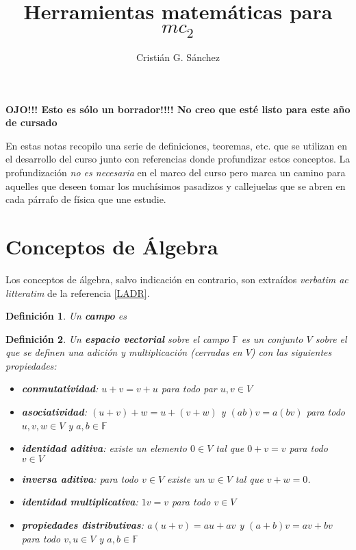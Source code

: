 \documentclass[a4paper,12pt]{article}
\newtheorem{defi}{Definición}
\begin{document}
\title{Herramientas matemáticas para $mc_2$}

\author{Cristián G. Sánchez}

\date{}

\maketitle

{\bf OJO!!! Esto es sólo un borrador!!!! No creo que esté listo para este año de cursado}

En estas notas recopilo una serie de definiciones, teoremas, etc. que se utilizan en el desarrollo del curso junto con referencias donde profundizar estos conceptos. La profundización {\em no es necesaria} en el marco del curso pero marca un camino para aquelles que deseen  tomar los muchísimos pasadizos y callejuelas que se abren en cada párrafo de física que une estudie.

\section{Conceptos de Álgebra}

Los conceptos de álgebra, salvo indicación en contrario, son extraídos {\em verbatim ac litteratim} de la referencia \ref{LADR}.

\begin{defi}
    Un {\bf campo} es 
\end{defi}

\begin{defi}
    Un {\bf espacio vectorial} sobre el campo $\mathbb{F}$ es un conjunto $V$ sobre el que se definen una adición y multiplicación (cerradas en $V$) con las siguientes propiedades:
    \begin{itemize}
        \item {\bf conmutatividad}: $u+v=v+u$ para todo par $u,v\in V$
        \item {\bf asociatividad}: $(u+v)+w=u+(v+w)$ y $(ab)v=a(bv)$ para todo $u,v,w\in V$ y $a,b\in\mathbb{F}$
        \item {\bf identidad aditiva}: existe un elemento $0\in V$ tal que  $0+v=v$ para todo $v\in V$
        \item {\bf inversa aditiva}: para todo $v\in V$ existe un $w\in V$ tal que $v+w=0$. 
        \item {\bf identidad multiplicativa}: $1v=v$ para todo $v\in V$
        \item {\bf propiedades distributivas}: $a(u+v)=au+av$ y $(a+b)v=av+bv$ para todo $v, u\in V$ y $a,b\in \mathbb{F}$
    \end{itemize}
\end{defi}
\end{document}
